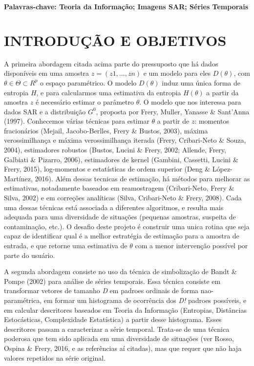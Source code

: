 \documentclass[12pt,letterpaper]{article}
\begin{document}
\textbf{Palavras-chave: Teoria da Informação; Imagens SAR; Séries Temporais} 
  
  \newpage
\section*{\centering \textbf{INTRODUÇÃO E OBJETIVOS}} %

A primeira abordagem citada acima parte do pressuposto que há dados disponíveis em uma amostra $z = (z1, . . . , zn)$ e um modelo para eles $D(\theta)$, com $\theta \in \Theta \subset R ^ p$ o espaço paramétrico. O modelo $D(\theta)$ induz uma única forma de entropia $H$, e para calcularmos uma estimativa da entropia $H(\theta)$ a partir da amostra $z$ é necessário estimar o parâmetro $\theta$. O modelo que nos interessa para dados SAR e a distribuição $G^0$, proposta por Frery, Muller, Yanasse \& Sant’Anna (1997). Conhecemos várias técnicas para estimar $\theta$ a partir de $z$: momentos fracionários (Mejail, Jacobo-Berlles, Frery \& Bustos, 2003), máxima verossimilhança e máxima verossimilhança iterada (Frery, Cribari-Neto \& Souza, 2004), estimadores robustos (Bustos, Lucini \& Frery, 2002; Allende, Frery, Galbiati \& Pizarro, 2006), estimadores de kernel (Gambini, Cassetti, Lucini \& Frery, 2015), log-momentos e estatísticas de ordem superior (Deng \& López-Martínez, 2016). Além dessas tecnicas de estimação, há métodos para melhorar as estimativas, notadamente baseados em reamostragem (Cribari-Neto, Frery \& Silva, 2002) e em correções analíticas (Silva, Cribari-Neto \& Frery, 2008). Cada uma dessas técnicas está associada a diferentes algoritmos, e resulta mais adequada para uma diversidade de situações (pequenas amostras, suspeita de contaminação, etc.). O desafio deste projeto é construir uma unica rotina que seja capaz de identificar qual é a melhor estratégia de estimação para a amostra de entrada, e que retorne uma estimativa de $\theta$ com a menor intervenção possível por parte do usuário.

A segunda abordagem consiste no uso da técnica de simbolização de Bandt \& Pompe (2002) para análise de séries temporais. Essa técnica consiste em transformar vetores de tamanho \textit{D} em padroes ordinais de forma nao-paramétrica, em formar um histograma de ocorrência dos \textit{D!} padroes possíveis, e em calcular descritores baseados em Teoria da Informação (Entropias, Distâncias Estocásticas, Complexidade Estatística) a partir desse histograma. Esses descritores passam a caracterizar a série temporal. Trata-se de uma técnica poderosa que tem sido aplicada em uma diversidade de situações (ver Rosso, Ospina \& Frery, 2016, e as referências aí citadas), mas que requer que não haja valores repetidos na série original.
\end{document}
